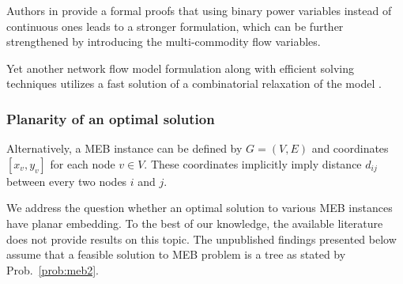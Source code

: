Authors in \cite{haugland11} provide a formal proofs that using binary power variables instead of continuous ones leads to a stronger formulation,
which can be further strengthened by introducing the multi-commodity flow variables.

Yet another network flow model formulation along with efficient solving techniques utilizes a fast solution of a combinatorial relaxation of the model \cite{min06}.

\subsubsection{Planarity of an optimal solution}

Alternatively, a MEB instance can be defined by $G=(V,E)$ and coordinates $\left[x_v,y_v\right]$ for each node $v\in V$.
These coordinates implicitly imply distance $d_{ij}$ between every two nodes $i$ and $j$.

We address the question whether an optimal solution to various MEB instances have planar embedding.
To the best of our knowledge, the available literature does not provide results on this topic.
The unpublished findings presented below assume that a feasible solution to  MEB problem is a tree as stated by Prob.~\ref{prob:meb2}.

